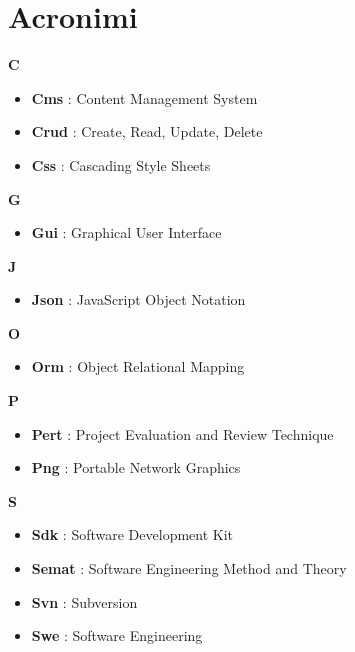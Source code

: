 \section{Acronimi}
{\huge \textbf{C}}
\begin{flushleft}
\begin{itemize}[label={}]
\item \textbf{Cms} : Content Management System
\item \textbf{Crud} : Create, Read, Update, Delete
\item \textbf{Css} : Cascading Style Sheets
\end{itemize}
\end{flushleft}
{\huge \textbf{G}}
\begin{flushleft}
\begin{itemize}[label={}]
\item \textbf{Gui} : Graphical User Interface
\end{itemize}
\end{flushleft}
{\huge \textbf{J}}
\begin{flushleft}
\begin{itemize}[label={}]
\item \textbf{Json} : JavaScript Object Notation
\end{itemize}
\end{flushleft}
{\huge \textbf{O}}
\begin{flushleft}
\begin{itemize}[label={}]
\item \textbf{Orm} : Object Relational Mapping
\end{itemize}
\end{flushleft}
{\huge \textbf{P}}
\begin{flushleft}
\begin{itemize}[label={}]
\item \textbf{Pert} : Project Evaluation and Review Technique
\item \textbf{Png} : Portable Network Graphics
\end{itemize}
\end{flushleft}
{\huge \textbf{S}}
\begin{flushleft}
\begin{itemize}[label={}]
\item \textbf{Sdk} : Software Development Kit
\item \textbf{Semat} : Software Engineering Method and Theory
\item \textbf{Svn} : Subversion
\item \textbf{Swe} : Software Engineering
\end{itemize}
\end{flushleft}
